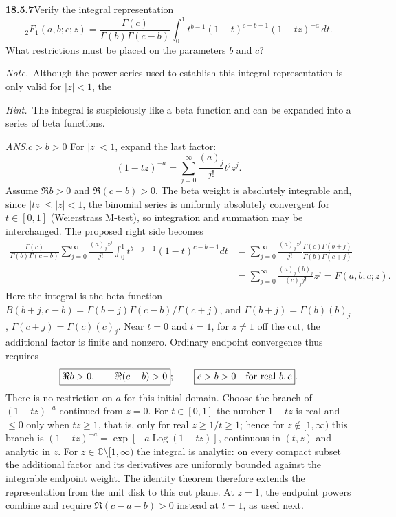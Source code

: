 \par\bigskip
\noindent\textbf{18.5.7}\quad Verify the integral representation
\[
{}_{2}F_{1}(a,b;c;z)=\frac{\Gamma(c)}{\Gamma(b)\Gamma(c-b)}
\int_{0}^{1}t^{b-1}(1-t)^{c-b-1}(1-tz)^{-a}\,dt.
\]
What restrictions must be placed on the parameters $b$ and $c$?
\par\emph{Note.}~Although the power series used to establish this
integral representation is only valid for $|z| < 1$, the
\erratum{principal representation is valid on
$\mathbb C\setminus[1,\infty)$.  Elsewhere specify matching analytic
continuation or boundary limits.  For nonintegral $a$, $[1,\infty)$
is the conventional cut.}
\par\emph{Hint.}~The integral is suspiciously like a beta function
and can be expanded into a series of beta functions.
\par\nobreak\hfill\emph{ANS.}\enspace$c>b>0$ 
\solution
For $|z|<1$, expand the last factor:
\[
(1-tz)^{-a}=\sum_{j=0}^\infty\frac{(a)_j}{j!}t^jz^j.
\]
Assume $\Re b>0$ and $\Re(c-b)>0$.  The beta weight is absolutely
integrable and, since $|tz|\le|z|<1$, the binomial series is
uniformly absolutely convergent for $t\in[0,1]$ (Weierstrass
M-test), so integration and summation may be interchanged.
The proposed right side becomes
\begin{align*}
\frac{\Gamma(c)}{\Gamma(b)\Gamma(c-b)}
 \sum_{j=0}^\infty\frac{(a)_jz^j}{j!}
 \int_0^1t^{b+j-1}(1-t)^{c-b-1}dt
 &=\sum_{j=0}^\infty\frac{(a)_jz^j}{j!}
 \frac{\Gamma(c)\Gamma(b+j)}{\Gamma(b)\Gamma(c+j)}\\
 &=\sum_{j=0}^\infty\frac{(a)_j(b)_j}{(c)_j j!}z^j
 =F(a,b;c;z).
\end{align*}
Here the integral is the beta function
$B(b+j,c-b)=\Gamma(b+j)\Gamma(c-b)/\Gamma(c+j)$, and
$\Gamma(b+j)=\Gamma(b)(b)_j$, $\Gamma(c+j)=\Gamma(c)(c)_j$.
Near $t=0$ and $t=1$, for $z\ne1$ off the cut, the additional
factor is finite and nonzero.  Ordinary endpoint convergence thus
requires
\[
\boxed{\Re b>0,\qquad \Re(c-b)>0};
\qquad\boxed{c>b>0\quad\hbox{for real }b,c}.
\]
There is no restriction on $a$ for this initial domain.
Choose the branch of $(1-tz)^{-a}$ continued from $z=0$.
For $t\in[0,1]$ the number $1-tz$ is real and $\le0$ only when
$tz\ge1$, that is, only for real $z\ge1/t\ge1$; hence for
$z\notin[1,\infty)$ this branch is
$(1-tz)^{-a}=\exp[-a\operatorname{Log}(1-tz)]$, continuous in
$(t,z)$ and analytic in $z$.
For $z\in\mathbb C\setminus[1,\infty)$ the integral is analytic:
on every compact subset the additional factor and its derivatives
are uniformly bounded against the integrable endpoint weight.
The identity theorem therefore extends the representation from the
unit disk to this cut plane.
  At $z=1$, the
endpoint powers combine and require $\Re(c-a-b)>0$ instead at
$t=1$, as used next.


